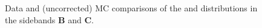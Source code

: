 \begin{figure}[!h]
{  }
  \caption{Data and (uncorrected) MC comparisons of the \scalht and \njet
    distributions in the sidebands \textbf{B} and \textbf{C}.}
  \label{fig:qcd_distributions_1}
\end{figure}

